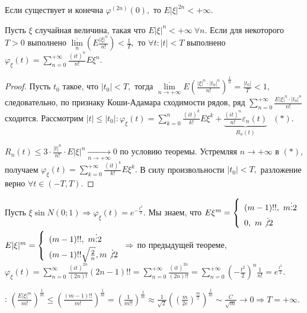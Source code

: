 	\begin{property}[б/д]
		Если существует и конечна \(\varphi^{(2n)}(0),\) то \(E|\xi|^{2n} < +\infty.\)
	\end{property}
	\begin{theorem}
		Пусть \(\xi\) случайная величина, такая что \(E|\xi|^n < +\infty~ \forall n.\) Если для некоторого \(T > 0\) выполнено \(\overline{\lim\limits_{n}}\left(E \frac{|\xi|^n}{n!}\right) < \frac{1}{T},\) то \(\forall t: |t| < T\) выполнено \(\varphi_\xi(t) = \sum\limits_{n = 0}^{+\infty} \frac{(it)^n}{n!}E\xi^n.\)
		\begin{proof}
			Пусть \(t_0\) такое, что \(|t_0| < T, \) тогда \(\overline{\lim\limits_{n \to +\infty}}E\left(\frac{|\xi|^n \cdot |t_0|^n}{n!}\right)^{\frac{1}{n}} = \frac{|t_0|}{T} < 1, \) следовательно, по признаку Коши-Адамара сходимости рядов, ряд \(\sum\limits_{n = 0}^{+\infty} \frac{E|\xi|^n\cdot|t_0|^n}{n!}\) сходится.
			Рассмотрим \(|t| \leqslant |t_0|: \varphi_\xi(t) = \sum\limits_{k = 0}^{n} \frac{(it)^k}{k!}E\xi^k + \underbrace{\frac{(it)^n}{n!}\varepsilon_n(t)}_{R_n(t)}~~~(*).\) 

			\noindent\(R_n(t) \leqslant 3\cdot \frac{|t|^n}{n!}\cdot E|\xi|^n \underset{n \to +\infty}{\longrightarrow} 0\) по условию теоремы. Устремляя \(n\to + \infty\) в \((*)\), получаем \(\varphi_\xi(t) = \sum\limits_{k = 0}^{+\infty} \frac{(it)^k}{k!}E\xi^k.\) В силу произвольности \(|t_0| < T,\) разложение верно \(\forall t \in (-T, T).\)
		\end{proof}
	\end{theorem}

	\begin{example}
		Пусть \(\xi \sin N(0;1) \Rightarrow \varphi_\xi(t) = e^{- \frac{t^2}{2}}.\) Мы знаем, что \(E\xi^m = \left\{
			\begin{array}{l}
			(m-1)!!, ~m \vdots 2\\
			0, ~m\not \vdots 2
			\end{array}
		\right.\)
		\(E|\xi|^m = \left\{
			\begin{array}{l}
			(m - 1)!!, ~m \vdots 2\\
			(m - 1)!!\sqrt{\frac{2}{n}}, m \not \vdots 2
			\end{array}
		\right. \Rightarrow\) по предыдущей теореме, 
		\(\varphi_\xi(t) = \sum\limits_{n = 0}^{\infty} \frac{(it)^{2n}}{(2n)!}(2n - 1)!! = \sum\limits_{n = 0}^{+\infty} \frac{(it)^{2n}}{(2n)!!} = \sum\limits_{n = 0}^{+\infty} \left(- \frac{t^2}{2}\right)^n \frac{1}{n!} = e^{\frac{t^2}{2}}.\)

		\underline{}: \(\left(\frac{E|\xi|^m}{m!}\right)^{\frac{1}{m}} \leqslant \left(\frac{(m - 1)!!}{m!}\right)^{\frac{1}{m}} = \left(\frac{1}{m!!}\right)^{\frac{1}{m}} \approx \frac{1}{\sqrt{2}}\left(\left(\frac{m}{2e}\right)^{\frac{m}{2}}\right)^{\frac{1}{m}} \sim \frac{C}{\sqrt{m}} \to 0 \Rightarrow T = + \infty.\)
	\end{example}

